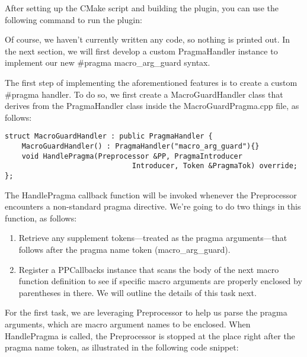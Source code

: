 After setting up the CMake script and building the plugin, you can use the following command to run the plugin:


Of course, we haven't currently written any code, so nothing is printed out. In the next section, we will first develop a custom PragmaHandler instance to implement our new \#pragma macro\_arg\_guard syntax.


The first step of implementing the aforementioned features is to create a custom \#pragma handler. To do so, we first create a MacroGuardHandler class that derives from the PragmaHandler class inside the MacroGuardPragma.cpp file, as follows:

\begin{lstlisting}[style=styleCXX]
struct MacroGuardHandler : public PragmaHandler {
	MacroGuardHandler() : PragmaHandler("macro_arg_guard"){}
	void HandlePragma(Preprocessor &PP, PragmaIntroducer
					          Introducer, Token &PragmaTok) override;
};
\end{lstlisting}

The HandlePragma callback function will be invoked whenever the Preprocessor encounters a non-standard pragma directive. We're going to do two things in this function, as follows:

\begin{enumerate}
\item Retrieve any supplement tokens—treated as the pragma arguments—that follows after the pragma name token (macro\_arg\_guard).

\item Register a PPCallbacks instance that scans the body of the next macro function definition to see if specific macro arguments are properly enclosed by parentheses in there. We will outline the details of this task next.
\end{enumerate}

For the first task, we are leveraging Preprocessor to help us parse the pragma arguments, which are macro argument names to be enclosed. When HandlePragma is called, the Preprocessor is stopped at the place right after the pragma name token, as illustrated in the following code snippet:

